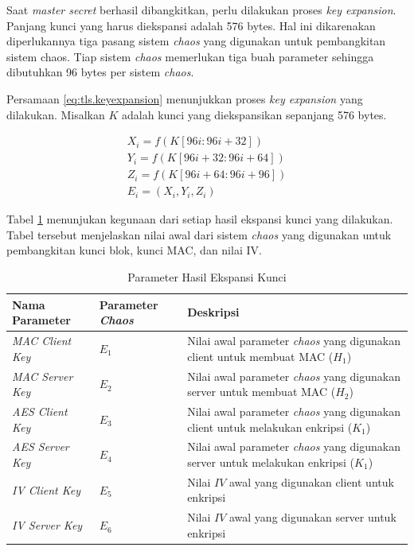 Saat \emph{master secret} berhasil dibangkitkan, perlu dilakukan proses \emph{key expansion}. Panjang kunci yang harus diekspansi adalah 576 bytes. Hal ini dikarenakan diperlukannya tiga pasang sistem \emph{chaos} yang digunakan untuk pembangkitan sistem chaos. Tiap sistem \emph{chaos} memerlukan tiga buah parameter sehingga dibutuhkan 96 bytes per sistem \emph{chaos}.

Persamaan \ref{eq:tls.keyexpansion} menunjukkan proses \emph{key expansion} yang dilakukan. Misalkan $K$ adalah kunci yang diekspansikan sepanjang 576 bytes.

\begin{equation}
  \begin{aligned}
    X_i = f(K[96i:96i+32]) \\
    Y_i = f(K[96i+32:96i+64]) \\
    Z_i = f(K[96i+64:96i+96]) \\
    E_i = (X_i, Y_i, Z_i)
  \end{aligned}
  \label{eq:tls.keyexpansion}
\end{equation}

Tabel \ref{tab:tls.keyexpansion} menunjukan kegunaan dari setiap hasil ekspansi kunci yang dilakukan. Tabel tersebut menjelaskan nilai awal dari sistem \emph{chaos} yang digunakan untuk pembangkitan kunci blok, kunci MAC, dan nilai IV.

\begin{table}[!h]
  \centering
  \caption{Parameter Hasil Ekspansi Kunci} \label{tab:tls.keyexpansion}
  \begin{tabular}{|p{3cm}|p{3cm}|p{6cm}|}
    \hline
    Nama Parameter & Parameter \emph{Chaos} & Deskripsi \\
    \hline
    \emph{MAC Client Key} & $E_1$ & Nilai awal parameter \emph{chaos} yang digunakan client untuk membuat MAC ($H_1$) \\ \hline
    \emph{MAC Server Key} & $E_2$ & Nilai awal parameter \emph{chaos} yang digunakan server untuk membuat MAC ($H_2$) \\ \hline
    \emph{AES Client Key}  & $E_3$ & Nilai awal  parameter \emph{chaos} yang digunakan client untuk melakukan enkripsi ($K_1$) \\ \hline
    \emph{AES Server Key}  & $E_4$ & Nilai awal parameter \emph{chaos} yang digunakan server untuk melakukan enkripsi ($K_1$) \\ \hline
    \emph{IV Client Key}  & $E_5$ & Nilai $IV$ awal yang digunakan client untuk enkripsi \\ \hline
    \emph{IV Server Key}  & $E_6$ & Nilai $IV$ awal yang digunakan server untuk enkripsi \\
    \hline
  \end{tabular}
\end{table}

